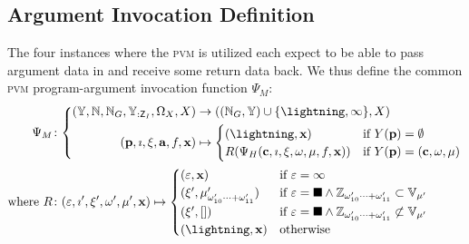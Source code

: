 \subsection{Argument Invocation Definition}

The four instances where the \textsc{pvm} is utilized each expect to be able to pass argument data in and receive some return data back. We thus define the common \textsc{pvm} program-argument invocation function $\Psi_M$:
\begin{align}
  \Psi_M&\colon \left\{\begin{aligned}
    (\Y, \N, \N_G, \Y_{:\mathsf{Z}_I}, \Omega_X, X) &\to ((\N_G, \Y) \cup \{\panic, \oog\}, X)\\
    (\mathbf{p}, \imath, \xi, \mathbf{a}, f, \mathbf{x}) &\mapsto \begin{cases}
      (\panic, \mathbf{x}) &\when Y(\mathbf{p}) = \none\\
      R(\Psi_H(\mathbf{c}, \imath, \xi, \omega, \mem, f, \mathbf{x})) &\when Y(\mathbf{p}) = (\mathbf{c}, \omega, \mem)
    \end{cases}
  \end{aligned}\right.\\
  \where R&\colon (\varepsilon, \imath', \xi', \omega', \mem', \mathbf{x}) \mapsto \begin{cases}
    (\varepsilon, \mathbf{x}) &\when \varepsilon = \oog \\
    (\xi', \mu'_{\omega'_{10}\dots+\omega'_{11}}) &\when \varepsilon = \halt \wedge \mathbb{Z}_{\omega'_{10}\dots+\omega'_{11}} \subset \mathbb{V}_{\mem'} \\
    (\xi', []) &\when \varepsilon = \halt \wedge \mathbb{Z}_{\omega'_{10}\dots+\omega'_{11}} \not\subset \mathbb{V}_{\mem'} \\
    (\panic, \mathbf{x}) &\otherwise \\
  \end{cases}
\end{align}
